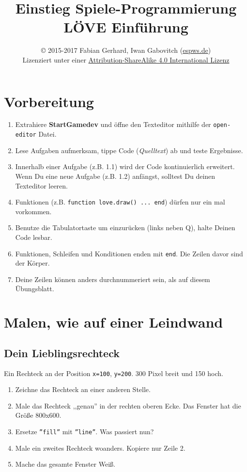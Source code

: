\documentclass[a4paper, 11pt]{article}
\date{\vspace{-5ex}}
\title{\vspace{-8ex}Einstieg Spiele-Programmierung LÖVE Einführung\vspace{-1ex}}
\author{\copyright{} 2015-2017 Fabian Gerhard, Iwan Gabovitch (\href{http://espws.de}{espws.de})\\
Lizenziert unter einer \href{http://creativecommons.org/licenses/by-sa/4.0/}{Attribution-ShareAlike 4.0 International Lizenz}}
\begin{document}
\maketitle
\thispagestyle{fancy} %

\section{Vorbereitung}

\begin{enumerate}
  \item Extrahiere \textbf{StartGamedev} und öffne den Texteditor mithilfe der \texttt{open-editor} Datei.
  \item Lese Aufgaben aufmerksam, tippe Code (\textit{Quelltext}) ab und teste Ergebnisse.
  \item Innerhalb einer Aufgabe (z.B. 1.1) wird der Code kontinuierlich erweitert. Wenn Du eine neue Aufgabe (z.B. 1.2) anfängst, solltest Du deinen Texteditor leeren.
  \item Funktionen (z.B. \texttt{function love.draw() ... end}) dürfen nur ein mal vorkommen.
  \item Benutze die Tabulatortaste um einzurücken (links neben Q), halte Deinen Code lesbar.
  \item Funktionen, Schleifen und Konditionen enden mit \texttt{\texttt{end}}. Die Zeilen davor sind der Körper.
  \item Deine Zeilen können anders durchnummeriert sein, als auf diesem Übungsblatt.
\end{enumerate}

\section{Malen, wie auf einer Leindwand}

\subsection{Dein Lieblingsrechteck}

Ein Rechteck an der Position \texttt{x=100}, \texttt{y=200}. 300 Pixel breit und 150 hoch.


\begin{enumerate}
\item Zeichne das Rechteck an einer anderen Stelle.
\item Male das Rechteck ,,genau'' in der rechten oberen Ecke. Das Fenster hat die Größe 800x600.
\item Ersetze \texttt{''fill''} mit \texttt{''line''}. Was passiert nun?
\item Male ein zweites Rechteck woanders. Kopiere nur Zeile 2.
\item Mache das gesamte Fenster Weiß.
\end{enumerate}
\end{document}
